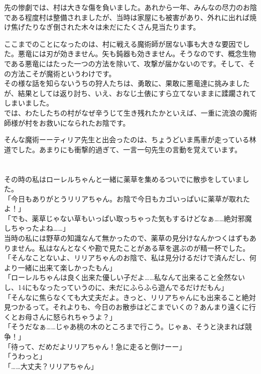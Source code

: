 \documentclass[oneside, a4paper]{jsbook}
\begin{document}
先の惨劇では、村は大きな傷を負いました。あれから一年、みんなの尽力のお陰である程度村は整備されましたが、当時は家屋にも被害があり、外れに出れば焼け焦げたりなぎ倒された木々は未だにたくさん見当たります。

ここまでのことになったのは、村に戦える魔術師が居ない事も大きな要因でした。悪竜には刃が効きません。矢も鈍器も効きません。そうなのです、概念生物である悪竜にはたった一つの方法を除いて、攻撃が届かないのです。そして、その方法こそが魔術というわけです。\\

その様な話を知らないうちの狩人たちは、勇敢に、果敢に悪竜達に挑みましたが、結果としては返り討ち、いえ、おなじ土俵にすら立てないままに蹂躙されてしまいました。\\

では、わたしたちの村がなぜ辛うじて生き残れたかといえば、一重に流浪の魔術師様が村をお救いになられたお陰です。

そんな魔術ーーティリア先生と出会ったのは、ちょうどいま馬車が走っている林道でした。あまりにも衝撃的過ぎて、一言一句先生の言動を覚えています。\\\\\\

その時の私はローレルちゃんと一緒に薬草を集めるついでに散歩をしていました。\\

\noindent
「今日もありがとうリリアちゃん。お陰で今日もカゴいっぱいに薬草が取れたよ！」\\
「でも、薬草じゃない草もいっぱい取っちゃった気もするけどなぁ……絶対邪魔しちゃったよね……」\\

当時の私には野草の知識なんて無かったので、薬草の見分けなんかつくはずもありません。私はなんとなくや勘で見たことがある草を選ぶのが精一杯でした。\\

\noindent
「そんなことないよ、リリアちゃんのお陰で、私は見分けるだけで済んだし、何より一緒に出来て楽しかったもん」\\
「ローレルちゃんは良く出来た優しい子だよ……私なんて出来ること全然ないし、14にもなったっていうのに、未だにふらふら遊んでるだけだもん」\\
「そんなに焦らなくても大丈夫だよ。きっと、リリアちゃんにも出来ること絶対見つかるって。それよりも、今日のお散歩はどこまでいくの？あんまり遠くに行くとお母さんに怒られちゃうよ？」\\
「そうだなぁ……じゃあ桃の木のところまで行こう。じゃぁ、そうと決まれば競争！」\\
「待って、だめだよリリアちゃん！急に走ると倒けーー」\\
「うわっと」\\
「……大丈夫？リリアちゃん」\\
\end{document}
